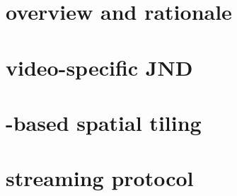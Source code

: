 
\section{\name overview and rationale}

\section{\vr video-specific JND}

\section{\vrjnd-based spatial tiling}

\section{\name streaming protocol}
